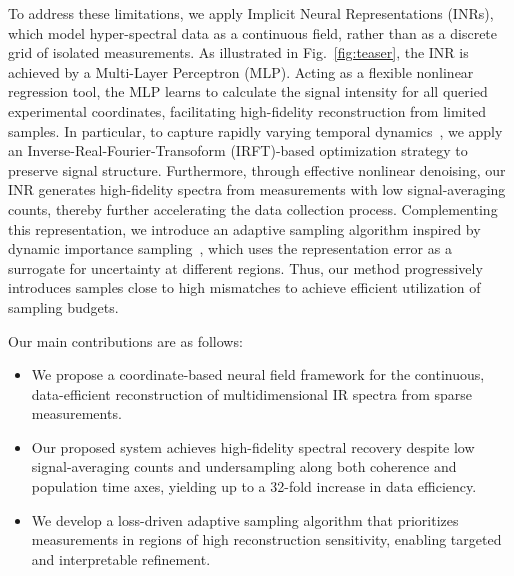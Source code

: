 \documentclass{optica-article}
\begin{document}
To address these limitations, we apply Implicit Neural Representations (INRs)\cite{chen2019learning, park2019deepsdf}, which model hyper-spectral data as a continuous field, rather than as a discrete grid of isolated measurements. As illustrated in Fig.~\ref{fig:teaser}, the INR is achieved by a Multi-Layer Perceptron (MLP). Acting as a flexible nonlinear regression tool, the MLP learns to calculate the signal intensity for all queried experimental coordinates, facilitating high-fidelity reconstruction from limited samples. In particular, to capture rapidly varying temporal dynamics~\cite{raissi2019physics, hao2022physics, ho2025differentiable}, we apply an Inverse-Real-Fourier-Transoform (IRFT)-based optimization strategy to preserve signal structure. Furthermore, through effective nonlinear denoising, our INR generates high-fidelity spectra from measurements with low signal-averaging counts, thereby further accelerating the data collection process. Complementing this representation, we introduce an adaptive sampling algorithm inspired by dynamic importance sampling~\cite{martel2021acorn}, which uses the representation error as a surrogate for uncertainty at different regions. Thus, our method progressively introduces samples close to high mismatches to achieve efficient utilization of sampling budgets.

\noindent Our main contributions are as follows:
\begin{itemize}
    \item We propose a coordinate-based neural field framework for the continuous, data-efficient reconstruction of multidimensional IR spectra from sparse measurements.
    \item Our proposed system achieves high-fidelity spectral recovery despite low signal-averaging counts and undersampling along both coherence and population time axes, yielding up to a 32-fold increase in data efficiency.
    \item We develop a loss-driven adaptive sampling algorithm that prioritizes measurements in regions of high reconstruction sensitivity, enabling targeted and interpretable refinement.
\end{itemize}


% 
\end{document}
